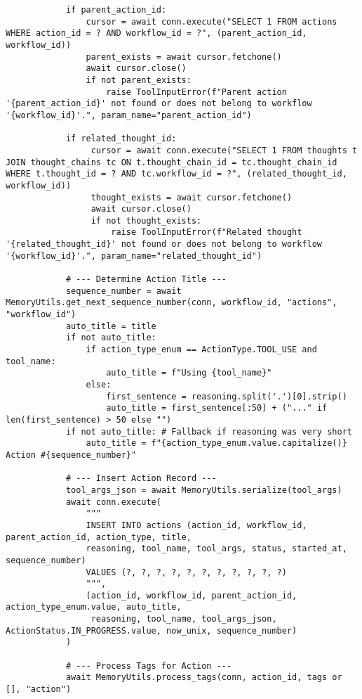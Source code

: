 \documentclass[12pt,a4paper]{article}
\begin{document}
\begin{pageablecode}
\begin{verbatim}
            if parent_action_id:
                cursor = await conn.execute("SELECT 1 FROM actions WHERE action_id = ? AND workflow_id = ?", (parent_action_id, workflow_id))
                parent_exists = await cursor.fetchone()
                await cursor.close()
                if not parent_exists:
                    raise ToolInputError(f"Parent action '{parent_action_id}' not found or does not belong to workflow '{workflow_id}'.", param_name="parent_action_id")

            if related_thought_id:
                 cursor = await conn.execute("SELECT 1 FROM thoughts t JOIN thought_chains tc ON t.thought_chain_id = tc.thought_chain_id WHERE t.thought_id = ? AND tc.workflow_id = ?", (related_thought_id, workflow_id))
                 thought_exists = await cursor.fetchone()
                 await cursor.close()
                 if not thought_exists:
                     raise ToolInputError(f"Related thought '{related_thought_id}' not found or does not belong to workflow '{workflow_id}'.", param_name="related_thought_id")

            # --- Determine Action Title ---
            sequence_number = await MemoryUtils.get_next_sequence_number(conn, workflow_id, "actions", "workflow_id")
            auto_title = title
            if not auto_title:
                if action_type_enum == ActionType.TOOL_USE and tool_name:
                    auto_title = f"Using {tool_name}"
                else:
                    first_sentence = reasoning.split('.')[0].strip()
                    auto_title = first_sentence[:50] + ("..." if len(first_sentence) > 50 else "")
            if not auto_title: # Fallback if reasoning was very short
                auto_title = f"{action_type_enum.value.capitalize()} Action #{sequence_number}"

            # --- Insert Action Record ---
            tool_args_json = await MemoryUtils.serialize(tool_args)
            await conn.execute(
                """
                INSERT INTO actions (action_id, workflow_id, parent_action_id, action_type, title,
                reasoning, tool_name, tool_args, status, started_at, sequence_number)
                VALUES (?, ?, ?, ?, ?, ?, ?, ?, ?, ?, ?)
                """,
                (action_id, workflow_id, parent_action_id, action_type_enum.value, auto_title,
                 reasoning, tool_name, tool_args_json, ActionStatus.IN_PROGRESS.value, now_unix, sequence_number)
            )

            # --- Process Tags for Action ---
            await MemoryUtils.process_tags(conn, action_id, tags or [], "action")


\end{verbatim}
\end{pageablecode}
\end{document}
